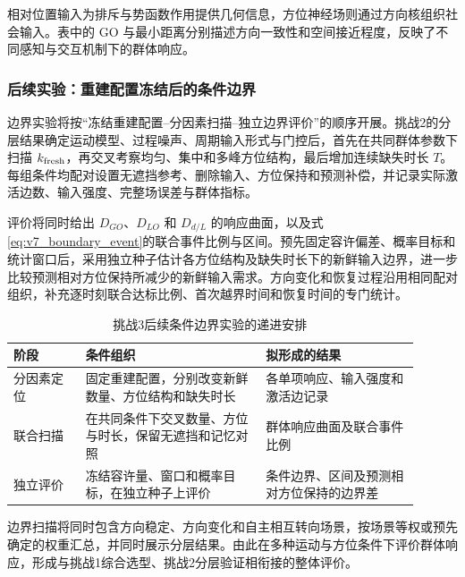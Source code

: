 \documentclass[UTF8,fontset=windows,11pt]{ctexart}
\begin{document}
相对位置输入为排斥与势函数作用提供几何信息，方位神经场则通过方向核组织社会输入。表中的 GO 与最小距离分别描述方向一致性和空间接近程度，反映了不同感知与交互机制下的群体响应。





\subsubsection{后续实验：重建配置冻结后的条件边界}\label{sec:challenge3_plan}
边界实验将按“冻结重建配置--分因素扫描--独立边界评价”的顺序开展。挑战2的分层结果确定运动模型、过程噪声、周期输入形式与门控后，首先在共同群体参数下扫描 $k_{\rm fresh}$，再交叉考察均匀、集中和多峰方位结构，最后增加连续缺失时长 $T$。每组条件均配对设置无遮挡参考、删除输入、方位保持和预测补偿，并记录实际激活边数、输入强度、完整场误差与群体指标。

评价将同时给出 $D_{GO}$、$D_{LO}$ 和 $D_{d/L}$ 的响应曲面，以及式\eqref{eq:v7_boundary_event}的联合事件比例与区间。预先固定容许偏差、概率目标和统计窗口后，采用独立种子估计各方位结构及缺失时长下的新鲜输入边界，进一步比较预测相对方位保持所减少的新鲜输入需求。方向变化和恢复过程沿用相同配对组织，补充逐时刻联合达标比例、首次越界时间和恢复时间的专门统计。



\begin{table}[!htbp]
\centering\small
\caption{挑战3后续条件边界实验的递进安排}
\label{tab:boundary_experiment_plan}
\begin{tabular}{>{\raggedright\arraybackslash}p{0.16\linewidth}
                >{\raggedright\arraybackslash}p{0.40\linewidth}
                >{\raggedright\arraybackslash}p{0.34\linewidth}}
\toprule
阶段 & 条件组织 & 拟形成的结果\\
\midrule
分因素定位 & 固定重建配置，分别改变新鲜数量、方位结构和缺失时长 & 各单项响应、输入强度和激活边记录\\[3pt]
联合扫描 & 在共同条件下交叉数量、方位与时长，保留无遮挡和记忆对照 & 群体响应曲面及联合事件比例\\[3pt]
独立评价 & 冻结容许量、窗口和概率目标，在独立种子上评价 & 条件边界、区间及预测相对方位保持的边界差\\
\bottomrule
\end{tabular}
\end{table}
边界扫描将同时包含方向稳定、方向变化和自主相互转向场景，按场景等权或预先确定的权重汇总，并同时展示分层结果。由此在多种运动与方位条件下评价群体响应，形成与挑战1综合选型、挑战2分层验证相衔接的整体评价。
\end{document}
